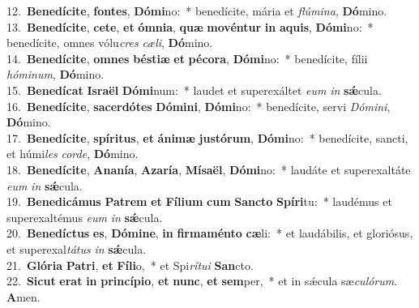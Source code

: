 {12.~}\textbf{Be}\textbf{ne}\textbf{dí}\textbf{ci}\textbf{te}, \textbf{fon}\textbf{tes}, \textbf{Dó}\textbf{mi}no:~* benedícite, mária et \textit{flú}\textit{mi}\textit{na}, \textbf{Dó}mino.\\
{13.~}\textbf{Be}\textbf{ne}\textbf{dí}\textbf{ci}\textbf{te}, \textbf{ce}\textbf{te}, \textbf{et} \textbf{óm}\textbf{ni}\textbf{a}, \textbf{quæ} \textbf{mo}\textbf{vén}\textbf{tur} \textbf{in} \textbf{a}\textbf{quis}, \textbf{Dó}\textbf{mi}no:~* benedícite, omnes vólu\textit{cres} \textit{cæ}\textit{li}, \textbf{Dó}mino.\\
{14.~}\textbf{Be}\textbf{ne}\textbf{dí}\textbf{ci}\textbf{te}, \textbf{om}\textbf{nes} \textbf{bé}\textbf{sti}\textbf{æ} \textbf{et} \textbf{pé}\textbf{co}\textbf{ra}, \textbf{Dó}\textbf{mi}no:~* benedícite, fílii \textit{hó}\textit{mi}\textit{num}, \textbf{Dó}mino.\\
{15.~}\textbf{Be}\textbf{ne}\textbf{dí}\textbf{cat} \textbf{Is}\textbf{ra}\textbf{ël} \textbf{Dó}\textbf{mi}num:~* laudet et superexáltet \textit{e}\textit{um} \textit{in} \textbf{sǽ}cula.\\
{16.~}\textbf{Be}\textbf{ne}\textbf{dí}\textbf{ci}\textbf{te}, \textbf{sa}\textbf{cer}\textbf{dó}\textbf{tes} \textbf{Dó}\textbf{mi}\textbf{ni}, \textbf{Dó}\textbf{mi}no:~* benedícite, servi \textit{Dó}\textit{mi}\textit{ni}, \textbf{Dó}mino.\\
{17.~}\textbf{Be}\textbf{ne}\textbf{dí}\textbf{ci}\textbf{te}, \textbf{spí}\textbf{ri}\textbf{tus}, \textbf{et} \textbf{á}\textbf{ni}\textbf{mæ} \textbf{ju}\textbf{stó}\textbf{rum}, \textbf{Dó}\textbf{mi}no:~* benedícite, sancti, et húmi\textit{les} \textit{cor}\textit{de}, \textbf{Dó}mino.\\
{18.~}\textbf{Be}\textbf{ne}\textbf{dí}\textbf{ci}\textbf{te}, \textbf{A}\textbf{na}\textbf{ní}\textbf{a}, \textbf{A}\textbf{za}\textbf{rí}\textbf{a}, \textbf{Mí}\textbf{sa}\textbf{ël}, \textbf{Dó}\textbf{mi}no:~* laudáte et superexaltáte \textit{e}\textit{um} \textit{in} \textbf{sǽ}cula.\\
{19.~}\textbf{Be}\textbf{ne}\textbf{di}\textbf{cá}\textbf{mus} \textbf{Pa}\textbf{trem} \textbf{et} \textbf{Fí}\textbf{li}\textbf{um} \textbf{cum} \textbf{San}\textbf{cto} \textbf{Spí}\textbf{ri}tu:~* laudémus et superexaltémus \textit{e}\textit{um} \textit{in} \textbf{sǽ}cula.\\
{20.~}\textbf{Be}\textbf{ne}\textbf{dí}\textbf{ctus} \textbf{es}, \textbf{Dó}\textbf{mi}\textbf{ne}, \textbf{in} \textbf{fir}\textbf{ma}\textbf{mén}\textbf{to} \textbf{cæ}li:~* et laudábilis, et gloriósus, et superexal\textit{tá}\textit{tus} \textit{in} \textbf{sǽ}cula.\\
{21.~}\textbf{Gló}\textbf{ri}\textbf{a} \textbf{Pa}\textbf{tri}, \textbf{et} \textbf{Fí}\textbf{li}o,~* et Spi\textit{rí}\textit{tu}\textit{i} \textbf{San}cto.\\
{22.~}\textbf{Si}\textbf{cut} \textbf{e}\textbf{rat} \textbf{in} \textbf{prin}\textbf{cí}\textbf{pi}\textbf{o}, \textbf{et} \textbf{nunc}, \textbf{et} \textbf{sem}per,~* et in sǽcula sæ\textit{cu}\textit{ló}\textit{rum}. \textbf{A}men.\\

